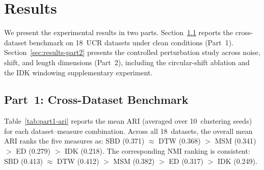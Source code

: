 
\section{Results}\label{sec:results}

We present the experimental results in two parts.
Section~\ref{sec:results-part1} reports the cross-dataset benchmark on 18~UCR datasets under clean conditions (Part~1).
Section~\ref{sec:results-part2} presents the controlled perturbation study across noise, shift, and length dimensions (Part~2), including the circular-shift ablation and the IDK windowing supplementary experiment.

\subsection{Part~1: Cross-Dataset Benchmark}\label{sec:results-part1}

Table~\ref{tab:part1-ari} reports the mean ARI (averaged over 10~clustering seeds) for each dataset--measure combination.
Across all 18~datasets, the overall mean ARI ranks the five measures as: SBD (0.371) $\approx$ DTW (0.368) $>$ MSM (0.341) $>$ ED (0.279) $>$ IDK (0.218).
The corresponding NMI ranking is consistent: SBD (0.413) $\approx$ DTW (0.412) $>$ MSM (0.382) $>$ ED (0.317) $>$ IDK (0.249).

